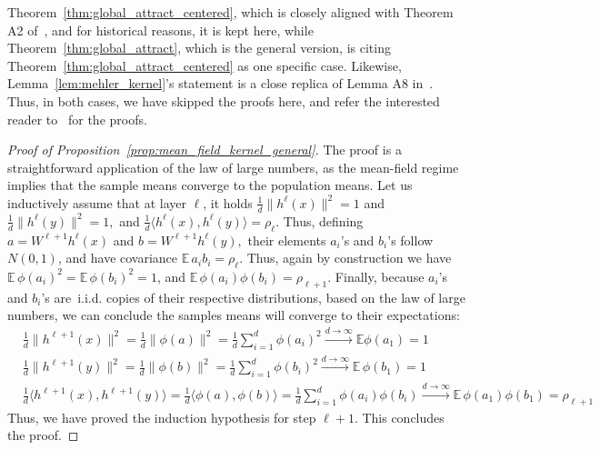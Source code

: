 \documentclass[twoside]{article}
\newcommand{\E}{\mathbb{E}\,}
\theoremstyle{definition}
\newcommand{\thomas}[1]{{\color{blue}\textit{#1}}}
\begin{document}
Theorem~\ref{thm:global_attract_centered}, which is closely aligned with Theorem A2 of~\citet{joudaki2023impact}, and for historical reasons, it is kept here, while Theorem~\ref{thm:global_attract}, which is the general version, is citing Theorem~\ref{thm:global_attract_centered} as one specific case. Likewise, Lemma~\ref{lem:mehler_kernel}'s statement is a close replica of Lemma A8 in~\cite{joudaki2023impact}. Thus, in both cases, we have skipped the proofs here, and refer the interested reader to~\cite{joudaki2023impact} for the proofs.


\begin{proof}[Proof of Proposition~\ref{prop:mean_field_kernel_general}]
 The proof is a straightforward application of the law of large numbers, as the mean-field regime implies that the sample means converge to the population means. Let us inductively assume that at layer $\ell$, it holds $\frac1d\|h^{\ell}(x)\|^2 = 1$ and $\frac1d\|h^{\ell}(y)\|^2=1,$ and $\frac1d\langle h^{\ell}(x),h^{\ell}(y)\rangle = \rho_{\ell}$. Thus, defining $a = W^{\ell+1} h^\ell(x)$ and $b = W^{\ell+1} h^\ell(y),$ their elements $a_i$'s and $b_i$'s follow $N(0,1)$, and have covariance $\E a_i b_i = \rho_{\ell}.$ Thus, again by construction we have $\E \phi(a_i)^2 = \E \phi(b_i)^2 = 1$, and $\E \phi(a_i)\phi(b_i) = \rho_{\ell+1}.$ Finally, because $a_i$'s and $b_i$'s are~i.i.d. copies of their respective distributions, based on the law of large numbers, we can conclude the samples means will converge to their expectations:
 \begin{align*}
&\frac{1}{d} \|h^{\ell+1}(x)\|^2 = \frac{1}{d} \|\phi(a)\|^2 = \frac{1}{d} \sum_{i=1}^d \phi(a_i)^2 \xrightarrow{d \to \infty} \mathbb{E} \phi(a_1) = 1\\
&\frac1d \|h^{\ell+1}(y)\|^2 = \frac1d \|\phi(b)\|^2 = \frac1d \sum_{i=1}^d \phi(b_i)^2 \xrightarrow{d \to \infty}  \E \phi(b_1) =  1\\
&\frac1d \langle h^{\ell+1}(x),h^{\ell+1}(y)\rangle = \frac1d \langle \phi(a),\phi(b)\rangle = \frac1d \sum_{i=1}^d \phi(a_i)\phi(b_i) \xrightarrow{d \to \infty}  \E \phi(a_1)\phi(b_1) = \rho_{\ell+1}
 \end{align*}
Thus, we have proved the induction hypothesis for step $\ell+1$. This concludes the proof. 
\end{proof}
\end{document}
